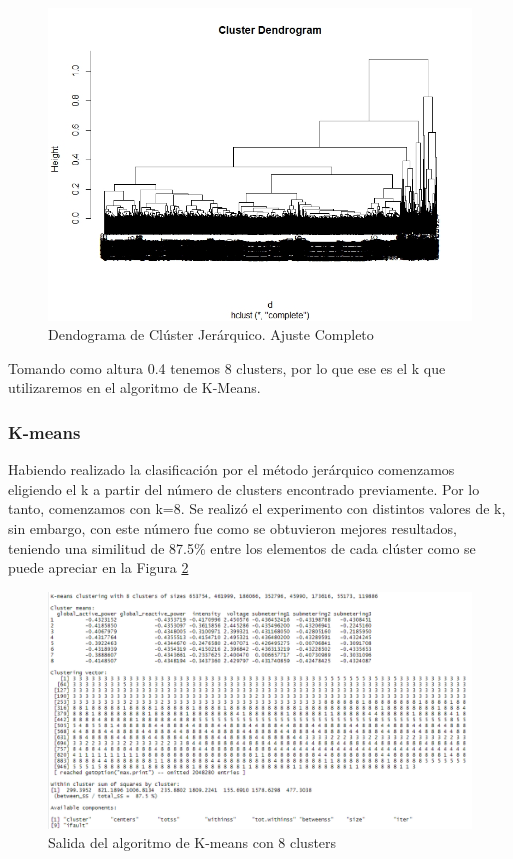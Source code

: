 \documentclass[a4paper,10pt,twocolumn]{report}
\begin{document}
	\begin{figure}[H]
	\centering
	\includegraphics[width=0.9\linewidth]{img/cluster/dendogram}
	\caption{Dendograma de Clúster Jerárquico. Ajuste Completo}
	\label{fig:dendogram}
	\end{figure}
	
	Tomando como altura 0.4 tenemos 8 clusters, por lo que ese es el k que utilizaremos en el algoritmo de K-Means.
	
	\subsubsection{K-means}
	
	Habiendo realizado la clasificación por el método jerárquico comenzamos eligiendo el k a partir del número de clusters encontrado previamente. Por lo tanto, comenzamos con k=8. Se realizó el experimento con distintos valores de k, sin embargo, con este número fue como se obtuvieron mejores resultados, teniendo una similitud de 87.5\% entre los elementos de cada clúster como se puede apreciar en la Figura \ref{fig:k-means}
		
	\begin{figure}[ht]
	\centering
	\includegraphics[width=1.8\columnwidth]{img/cluster/k-means}
	\caption{Salida del algoritmo de K-means con 8 clusters}
	\label{fig:k-means}
	\end{figure}
	
\end{document}
